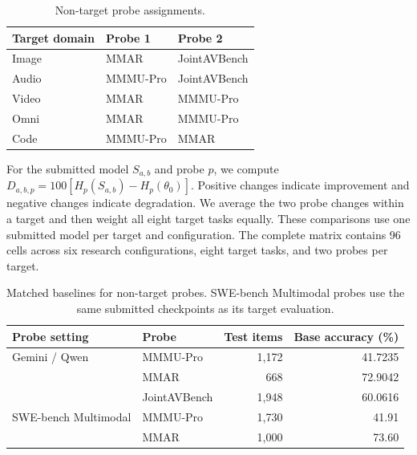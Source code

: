 \begin{table}[!htbp]
\miletablestyle
\caption{Non-target probe assignments.}
\label{tab:probeplan}
\begin{tabular*}{\linewidth}{@{\extracolsep{\fill}}lll@{}}
\toprule
Target domain & Probe 1 & Probe 2 \\
\midrule
Image & MMAR & JointAVBench \\
Audio & MMMU-Pro & JointAVBench \\
Video & MMAR & MMMU-Pro \\
Omni & MMAR & MMMU-Pro \\
Code & MMMU-Pro & MMAR \\
\bottomrule
\end{tabular*}
\end{table}

For the submitted model $S_{a,b}$ and probe $p$, we compute $D_{a,b,p}=100[H_p(S_{a,b})-H_p(\theta_0)]$. Positive changes indicate improvement and negative changes indicate degradation. We average the two probe changes within a target and then weight all eight target tasks equally. These comparisons use one submitted model per target and configuration. The complete matrix contains 96 cells across six research configurations, eight target tasks, and two probes per target.

\begin{table}[!htbp]
\miletablestyle
\caption{Matched baselines for non-target probes. SWE-bench Multimodal probes use the same submitted checkpoints as its target evaluation.}
\label{tab:matched-probe-base}
\begin{tabular*}{\linewidth}{@{\extracolsep{\fill}}llrr@{}}
\toprule
Probe setting & Probe & Test items & Base accuracy (\%) \\
\midrule
Gemini / Qwen & MMMU-Pro & 1,172 & 41.7235 \\
 & MMAR & 668 & 72.9042 \\
 & JointAVBench & 1,948 & 60.0616 \\
\midrule
SWE-bench Multimodal & MMMU-Pro & 1,730 & 41.91 \\
 & MMAR & 1,000 & 73.60 \\
\bottomrule
\end{tabular*}
\end{table}

